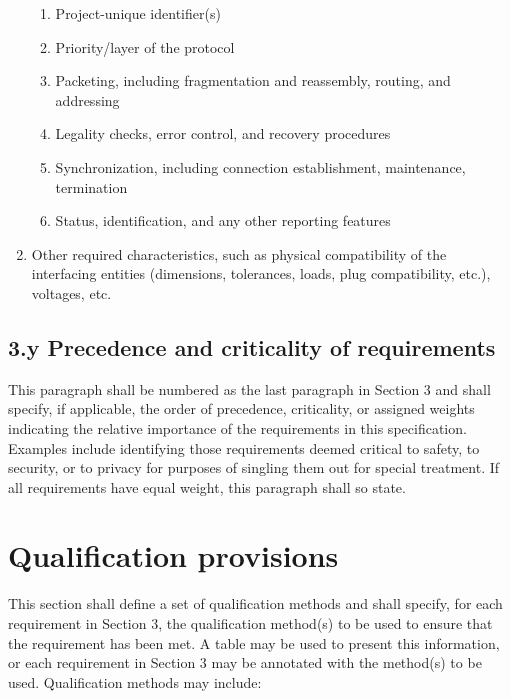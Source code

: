 \begin{enumerate}
  \begin{enumerate}
  \itemsep1pt\parskip0pt
  \item
    Project-unique identifier(s)
  \item
    Priority/layer of the protocol
  \item
    Packeting, including fragmentation and reassembly, routing, and
    addressing
  \item
    Legality checks, error control, and recovery procedures
  \item
    Synchronization, including connection establishment, maintenance,
    termination
  \item
    Status, identification, and any other reporting features
  \end{enumerate}
\item
  Other required characteristics, such as physical compatibility of the
  interfacing entities (dimensions, tolerances, loads, plug
  compatibility, etc.), voltages, etc.
\end{enumerate}

\subsection{3.y Precedence and criticality of requirements}

This paragraph shall be numbered as the last paragraph in Section 3 and
shall specify, if applicable, the order of precedence, criticality, or
assigned weights indicating the relative importance of the requirements
in this specification. Examples include identifying those requirements
deemed critical to safety, to security, or to privacy for purposes of
singling them out for special treatment. If all requirements have equal
weight, this paragraph shall so state.

\section{Qualification provisions}

This section shall define a set of qualification methods and shall
specify, for each requirement in Section 3, the qualification method(s)
to be used to ensure that the requirement has been met. A table may be
used to present this information, or each requirement in Section 3 may
be annotated with the method(s) to be used. Qualification methods may
include:


